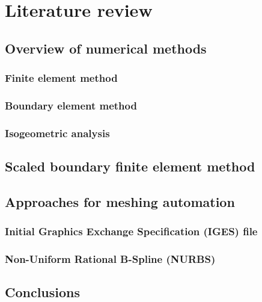 
\chapter{Literature review}

\section{Overview of numerical methods}

    \subsection{Finite element method}

    \subsection{Boundary element method}

    \subsection{Isogeometric analysis}

\section{Scaled boundary finite element method}

\section{Approaches for meshing automation}

    \subsection{Initial Graphics Exchange Specification (IGES) file}

    \subsection{Non-Uniform Rational B-Spline (NURBS)}

\section{Conclusions}